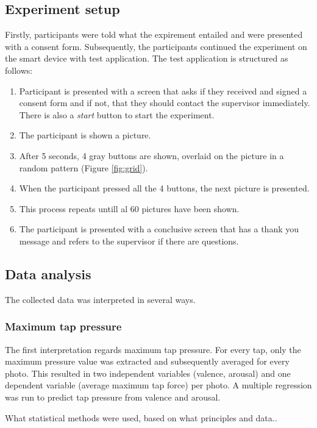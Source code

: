 \documentclass{sig-alternate}
\begin{document}

\subsection{Experiment setup} %
\label{sub:experiment_setup}
Firstly, participants were told what the expirement entailed and were presented with a consent form. Subsequently, the participants continued the experiment on the smart device with test application. The test application is structured as follows:
\begin{enumerate}
	\item Participant is presented with a screen that asks if they received and signed a consent form and if not, that they should contact the supervisor immediately. There is also a \textit{start} button to start the experiment.
	\item The participant is shown a picture.
	\item After 5 seconds, 4 gray buttons are shown, overlaid on the picture in a random pattern (Figure \ref{fig:grid}).
	\item When the participant pressed all the 4 buttons, the next picture is presented.
	\item This process repeats untill al 60 pictures have been shown.
	\item The participant is presented with a conclusive screen that has a thank you message and refers to the supervisor if there are questions.
\end{enumerate}

\subsection{Data analysis}
The collected data was interpreted in several ways.

\subsubsection{Maximum tap pressure}
The first interpretation regards maximum tap pressure. For every tap, only the maximum pressure value was extracted and subsequently averaged for every photo. This resulted in two independent variables (valence, arousal) and one dependent  variable (average maximum tap force) per photo. A multiple regression was run to predict tap pressure from valence and arousal. 

What statistical methods were used, based on what principles and data..
\end{document}
